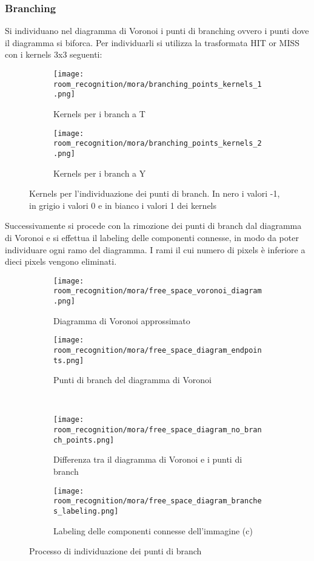 \subsubsection{Branching}
Si individuano nel diagramma di Voronoi i punti di branching ovvero i punti dove il diagramma si biforca. Per individuarli si utilizza la trasformata HIT or MISS con i kernels 3x3 seguenti:
\begin{figure}[H]
  \centering
  \begin{subfigure}[t]{\textwidth}
    \centering
    \texttt{[image: room\_recognition/mora/branching\_points\_kernels\_1.png]}
    \caption{Kernels per i branch a T}
  \end{subfigure}
  \begin{subfigure}[t]{\textwidth}
    \centering
    \texttt{[image: room\_recognition/mora/branching\_points\_kernels\_2.png]}
    \caption{Kernels per i branch a Y}
  \end{subfigure}
  \caption{Kernels per l'individuazione dei punti di branch. In nero i valori -1, in grigio i valori 0 e in bianco i valori 1 dei kernels}
\end{figure}
\noindent
Successivamente si procede con la rimozione dei punti di branch dal diagramma di Voronoi e si effettua il {labeling delle componenti connesse}, in modo da poter individuare ogni ramo del diagramma. I rami il cui numero di pixels è inferiore a dieci pixels vengono eliminati.
\begin{figure}[H]
  \centering

  \begin{subfigure}[t]{.45\textwidth}
    \centering
    \texttt{[image: room\_recognition/mora/free\_space\_voronoi\_diagram.png]}
    \caption{Diagramma di Voronoi approssimato}
  \end{subfigure}
  \begin{subfigure}[t]{.45\textwidth}
    \centering
    \texttt{[image: room\_recognition/mora/free\_space\_diagram\_endpoints.png]}
    \caption{Punti di branch del diagramma di Voronoi}
  \end{subfigure}\\
  \begin{subfigure}[t]{.45\textwidth}
    \centering
    \texttt{[image: room\_recognition/mora/free\_space\_diagram\_no\_branch\_points.png]}
    \caption{Differenza tra il diagramma di Voronoi e i punti di branch}
  \end{subfigure}
  \begin{subfigure}[t]{.45\textwidth}
    \centering
    \texttt{[image: room\_recognition/mora/free\_space\_diagram\_branches\_labeling.png]}
    \caption{Labeling delle componenti connesse dell'immagine {(c)}}
  \end{subfigure}
  \caption{Processo di individuazione dei punti di branch}
\end{figure}

